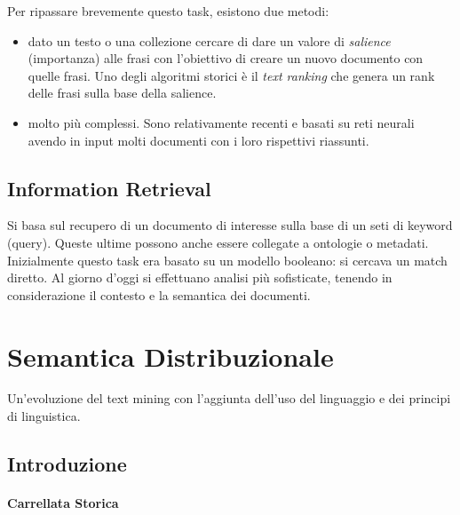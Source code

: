 Per ripassare brevemente questo task, esistono due metodi:

\begin{itemize}
  \item {} dato un testo o una collezione cercare di dare un valore di \textit{salience} (importanza) alle frasi con l'obiettivo di creare un nuovo documento con quelle frasi. Uno degli algoritmi storici è il \textit{text ranking} che genera un rank delle frasi sulla base della salience. 
  \item {} molto più complessi. Sono relativamente recenti e basati su reti neurali avendo in input molti documenti con i loro rispettivi riassunti.
\end{itemize}


\subsection{Information Retrieval}

Si basa sul recupero di un documento di interesse sulla base di un seti di keyword (query). Queste ultime possono anche essere collegate a ontologie o metadati. Inizialmente questo task era basato su un modello booleano: si cercava un match diretto. Al giorno d'oggi si effettuano analisi più sofisticate, tenendo in considerazione il contesto e la semantica dei documenti.

\section{Semantica Distribuzionale}

Un'evoluzione del text mining con l'aggiunta dell'uso del linguaggio e dei principi di linguistica. 

\subsection{Introduzione}

\paragraph{Carrellata Storica}

